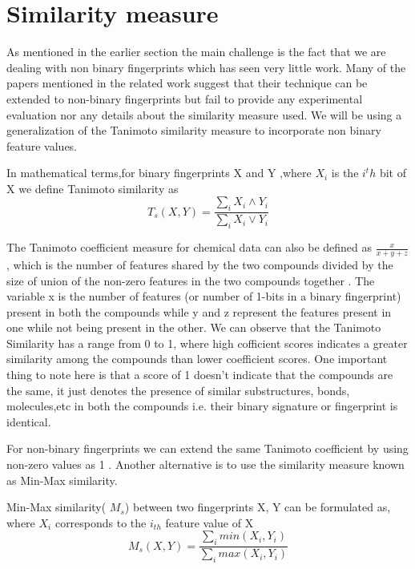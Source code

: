\section{Similarity measure}

As mentioned in the earlier section the main challenge is the fact that we are dealing with non binary fingerprints which has seen very little work. Many of the papers mentioned in the related work suggest that their technique can be extended to non-binary fingerprints but fail to provide any experimental evaluation nor any details about the similarity measure used. We will be using a generalization of the Tanimoto similarity measure to incorporate non binary feature values. 

\begin{dfn}
In mathematical terms,for binary fingerprints X and Y ,where $X_i$ is the $i^th$ bit of X we define Tanimoto similarity as
\begin{equation}
T_s(X,Y) = \frac{\sum \limits_i X_i \wedge Y_i} {\sum \limits_i X_i \vee Y_i} 
\end{equation}
\end{dfn}

The Tanimoto coefficient measure for chemical data can also be defined  as $\frac{x}{x+y+z}$, which is the number of features shared by the two compounds divided by the size of union of the non-zero features in the two compounds together . The variable x is the number of features (or number of 1-bits in a binary fingerprint) present in both the compounds while y and z represent the features present in one while not being present in the other. We can observe that the Tanimoto Similarity has a range from 0 to 1, where high cofficient scores indicates a greater similarity among the compounds than lower coefficient scores. One important thing to note here is that a score of 1 doesn't indicate that the compounds are the same, it just denotes the presence of similar substructures, bonds, molecules,etc in both the compounds i.e. their binary signature or fingerprint is identical. 

For non-binary fingerprints we can extend the same Tanimoto coefficient by using non-zero values as 1 . Another alternative is to use the similarity measure known as Min-Max similarity. 

\begin{dfn}
Min-Max similarity( $M_s$) between two fingerprints X, Y can be formulated as, where $X_i$ corresponds to the $i_{th}$ feature value of X 
\begin{equation}
 M_s(X,Y) = \frac{\sum \limits_{i} min(X_i, Y_i)}{\sum \limits_{i} max(X_i, Y_i)}
\end{equation}
\end{dfn}

